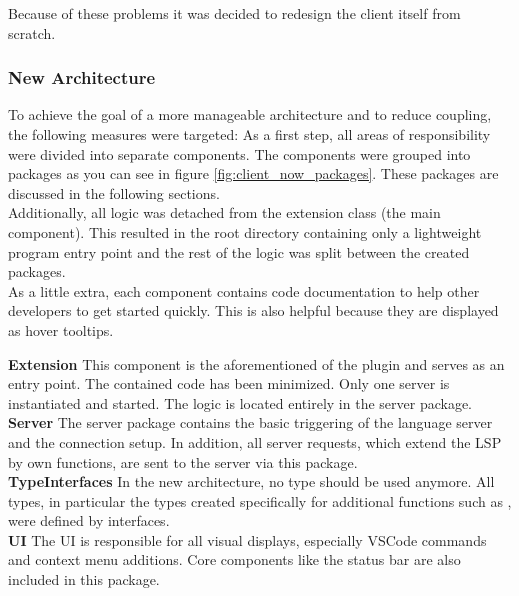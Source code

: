 Because of these problems it was decided to redesign the client itself from scratch.

\subsubsection{New Architecture}
To achieve the goal of a more manageable architecture and to reduce coupling, the following measures were targeted:
As a first step, all areas of responsibility were divided into separate components.
The components were grouped into packages as you can see in figure \ref{fig:client_now_packages}.
These packages are discussed in the following sections. \\

Additionally, all logic was detached from the extension class (the main component).
This resulted in the root directory containing only a lightweight program entry point
and the rest of the logic was split between the created packages. \\

As a little extra, each component contains code documentation to help other developers to get started quickly. This is also helpful because they are displayed as hover tooltips.


{\bf Extension} \textendash{}
This component is the aforementioned  of the plugin and serves as an entry point. The contained code has been minimized. Only one server is instantiated and started. The logic is located entirely in the server package. \\

{\bf Server} \textendash{}
The server package contains the basic triggering  of the language server and the connection setup. In addition, all server requests, which extend the LSP by own functions, are sent to the server via this package. \\

{\bf TypeInterfaces} \textendash{}
In the new architecture, no  type should be used anymore. All types, in particular the types created specifically for additional functions such as , were defined by interfaces. \\

{\bf UI} \textendash{}
The UI is responsible for all visual displays, especially VSCode commands and context menu additions. Core components like the status bar are also included in this package. \\

